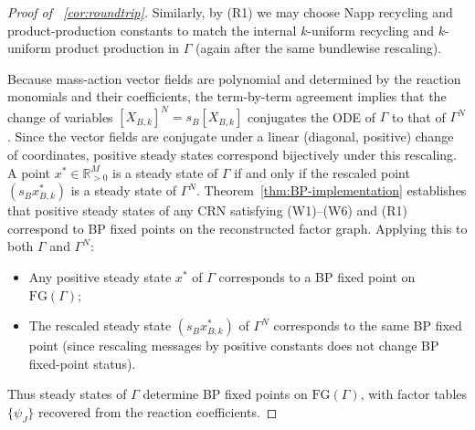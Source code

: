 \documentclass[10pt,a4paper]{amsart}
\begin{document}
\begin{proof}[Proof of ~\ref{cor:roundtrip}]
Similarly, by (R1) we may choose Napp recycling and product-production constants to 
match the internal $k$-uniform recycling and $k$-uniform product production in $\Gamma$ 
(again after the same bundlewise rescaling).

Because mass-action vector fields are polynomial and determined by the reaction 
monomials and their coefficients, the term-by-term agreement implies that the change 
of variables $[X_{B,k}]^N = s_B [X_{B,k}]$ conjugates the ODE of $\Gamma$ to that 
of $\Gamma^N$.
Since the vector fields are conjugate under a linear (diagonal, positive) change of 
coordinates, positive steady states correspond bijectively under this rescaling. 
A point $x^* \in \mathbb{R}^M_{>0}$ is a steady state of $\Gamma$ if and only if 
the rescaled point $(s_B x^*_{B,k})$ is a steady state of $\Gamma^N$.
Theorem~\ref{thm:BP-implementation} establishes that positive steady states of any 
CRN satisfying (W1)--(W6) and (R1) correspond to BP fixed points on the reconstructed 
factor graph. Applying this to both $\Gamma$ and $\Gamma^N$:
\begin{itemize}
\item Any positive steady state $x^*$ of $\Gamma$ corresponds to a BP fixed point on 
$\mathrm{FG}(\Gamma)$;
\item The rescaled steady state $(s_B x^*_{B,k})$ of $\Gamma^N$ corresponds to the 
same BP fixed point (since rescaling messages by positive constants does not change 
BP fixed-point status).
\end{itemize}

Thus steady states of $\Gamma$ determine BP fixed points on $\mathrm{FG}(\Gamma)$, 
with factor tables $\{\psi_J\}$ recovered from the reaction coefficients.
\end{proof}
\end{document}
